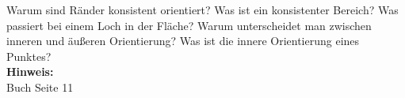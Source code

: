\begin{question}[section=1,subsection=12,name={Orientierungen},difficulty=2,type=mdl,mode=exm,tags={}]
	Warum sind Ränder konsistent orientiert? Was ist ein konsistenter Bereich? Was passiert bei einem Loch in der Fläche? Warum unterscheidet man zwischen inneren und äußeren Orientierung? Was ist die innere Orientierung eines Punktes?
	\\ \textbf{Hinweis:}\\
	Buch Seite 11
\end{question}
\begin{solution}
	
\end{solution}